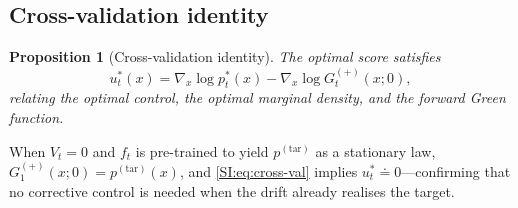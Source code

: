 \documentclass[11pt,onecolumn]{article}
\newcommand{\ptar}{p^{(\mathrm{tar})}}
\newtheorem{proposition}[theorem]{Proposition}
\begin{document}
\subsection{Cross-validation identity}
\label{SI:ia:cv}

\begin{proposition}[Cross-validation identity]
\label{prop:cv}
The optimal score satisfies
\begin{equation}
  u_t^*(x)
  = \nabla_x\log p_t^*(x) - \nabla_x\log G_t^{(+)}(x;0),
  \label{SI:eq:cross-val}
\end{equation}
relating the optimal control, the optimal marginal density, and the
forward Green function.
\end{proposition}

When $V_t=0$ and $f_t$ is pre-trained to yield $\ptar$ as a stationary
law, $G_1^{(+)}(x;0)=\ptar(x)$, and \eqref{SI:eq:cross-val} implies
$u_t^*\doteq 0$---confirming that no corrective control is needed when
the drift already realises the target.

%
%
\end{document}
